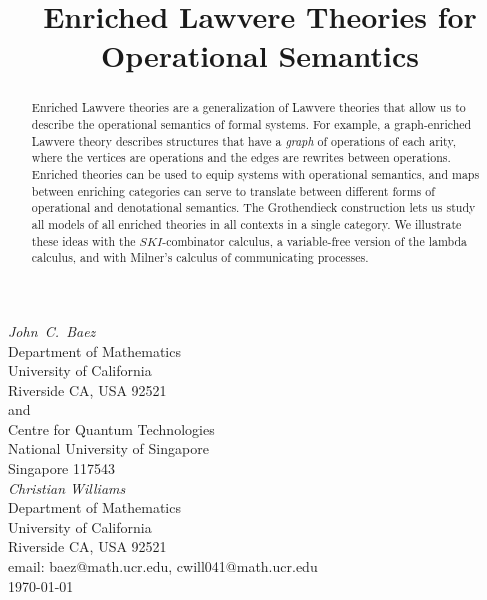 \documentclass{amsart}
\theoremstyle{definition}
\begin{document}
\title{Enriched Lawvere Theories 
for Operational Semantics \\}

\maketitle
\begin{center}   
  {\em John\ C.\ Baez \\}
  \vspace{0.3cm}
  {\small
 Department of Mathematics \\
    University of California \\
  Riverside CA, USA 92521 \\ and \\
 Centre for Quantum Technologies  \\
    National University of Singapore \\
    Singapore 117543  \\    } 
  \vspace{0.4cm}
{\em Christian Williams \\}
\vspace{0.3cm}
   {\small
   Department of Mathematics \\
  University of California \\
  Riverside CA, USA 92521 \\}
  \vspace{0.3cm}   
  {\small email:  baez@math.ucr.edu, cwill041@math.ucr.edu\\} 
  \vspace{0.3cm}   
  {\small \today}
  \vspace{0.3cm}   
\end{center} 

\begin{abstract} 
Enriched Lawvere theories are a generalization of Lawvere theories that allow us to describe the operational semantics of formal systems.  For example, a graph-enriched Lawvere theory describes structures that have a \emph{graph} of operations of each arity, where the vertices are operations and the edges are rewrites between operations. Enriched theories can be used to equip systems with operational semantics, and maps between enriching categories can serve to translate between different forms of operational and denotational semantics.  The Grothendieck construction lets us study all models of all enriched theories
in all contexts in a single category.  We illustrate these ideas with the $SKI$-combinator calculus, a variable-free version of the lambda calculus, and with Milner's calculus of communicating processes.
\end{abstract}
\end{document}
